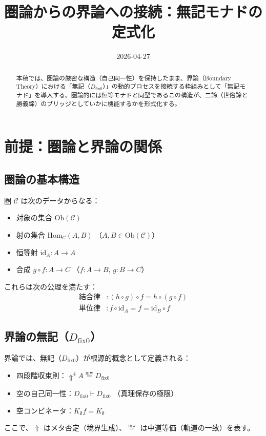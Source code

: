 \documentclass[11pt,a4paper]{article}
\theoremstyle{definition}
\newcommand{\mweq}{\mathrel{\overset{\mathrm{mw}}{=}}}
\newcommand{\dfix}{D_{\mathrm{fix}0}} %
\newcommand{\metanegation}{\Uparrow}     %
\begin{document}
\title{圏論からの界論への接続：無記モナドの定式化}
\author{}
\date{2026-04-27}
\maketitle

\begin{abstract}
本稿では、圏論の厳密な構造（自己同一性）を保持したまま、界論（Boundary Theory）における「無記（$\dfix$）」の動的プロセスを接続する枠組みとして「無記モナド」を導入する。圏論的には恒等モナドと同型であるこの構造が、二諦（世俗諦と勝義諦）のブリッジとしていかに機能するかを形式化する。
\end{abstract}

\section{前提：圏論と界論の関係}

\subsection{圏論の基本構造}
圏 $\mathcal{C}$ は次のデータからなる：
\begin{itemize}
    \item 対象の集合 $\mathrm{Ob}(\mathcal{C})$
    \item 射の集合 $\mathrm{Hom}_{\mathcal{C}}(A,B)$ （$A,B \in \mathrm{Ob}(\mathcal{C})$）
    \item 恒等射 $\mathrm{id}_A : A \to A$
    \item 合成 $g \circ f : A \to C$ （$f : A \to B$, $g : B \to C$）
\end{itemize}
これらは次の公理を満たす：
\begin{align}
    \text{結合律} &: (h \circ g) \circ f = h \circ (g \circ f) \\
    \text{単位律} &: f \circ \mathrm{id}_A = f = \mathrm{id}_B \circ f
\end{align}

\subsection{界論の無記（$\dfix$）}
界論では、無記（$\dfix$）が根源的概念として定義される：
\begin{itemize}
    \item 四段階収束則：$\metanegation^4 A \mweq \dfix$
    \item 空の自己同一性：$\dfix \vdash \dfix$ （真理保存の極限）
    \item 空コンビネータ：$K_\emptyset f = K_\emptyset$
\end{itemize}
ここで、$\metanegation$ はメタ否定（境界生成）、$\mweq$ は中道等価（軌道の一致）を表す。
\end{document}
